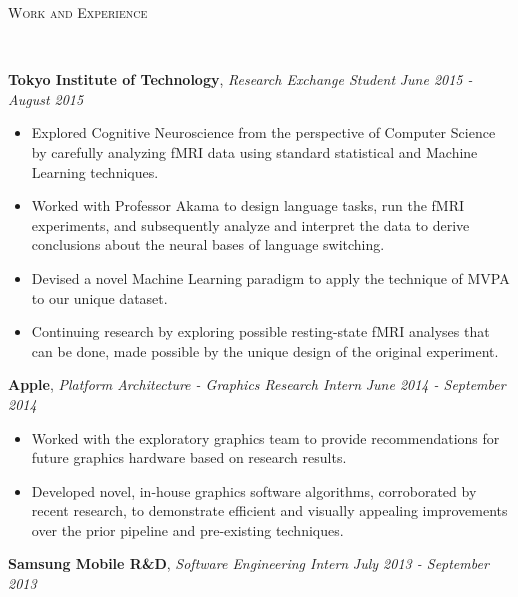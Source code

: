 \documentclass[9pt]{article}
\newenvironment{changemargin}[2]{%
  \begin{list}{}{%
    \setlength{\topsep}{0pt}%
    \setlength{\leftmargin}{#1}%
    \setlength{\rightmargin}{#2}%
    \setlength{\listparindent}{\parindent}%
    \setlength{\itemindent}{\parindent}%
    \setlength{\parsep}{\parskip}%
  }%
  \item[]}{\end{list}
}
\newcommand{\lineover}{
	\begin{changemargin}{-0.05in}{-0.05in}
		\vspace*{-8pt}
		\hrulefill \\
		\vspace*{-2pt}
	\end{changemargin}
}
\newcommand{\header}[1]{
	\begin{changemargin}{-0.5in}{-0.5in}
		\scshape{#1}\\
  	\lineover
	\end{changemargin}
}
\newenvironment{body} {
	\vspace*{-16pt}
	\begin{changemargin}{-0.25in}{-0.5in}
  }	
	{\end{changemargin}
}
\begin{document}
\header{Work and Experience}
\begin{body}
	\vspace{18pt}
	\textbf{Tokyo Institute of Technology}, \emph{Research Exchange Student} \hfill \emph{June 2015 - August 2015}\\
	\vspace*{-3pt}
	\begin{itemize} \itemsep -0pt %
	\item Explored Cognitive Neuroscience from the perspective of Computer Science by carefully analyzing fMRI data using standard statistical and Machine Learning techniques.
	\item Worked with Professor Akama to design language tasks, run the fMRI experiments, and subsequently analyze and interpret the data to derive conclusions about the neural bases of language switching.
	\item Devised a novel Machine Learning paradigm to apply the technique of MVPA to our unique dataset.
	\item Continuing research by exploring possible resting-state fMRI analyses that can be done, made possible by the unique design of the original experiment.
	\end{itemize}
	\vspace*{1pt}
	\textbf{Apple}, \emph{Platform Architecture - Graphics Research Intern} \hfill \emph{June 2014 - September 2014}\\
	\vspace*{-3pt}
	\begin{itemize} \itemsep -0pt %
	\item Worked with the exploratory graphics team to provide recommendations for future graphics hardware based on research results.
	\item Developed novel, in-house graphics software algorithms, corroborated by recent research, to demonstrate efficient and visually appealing improvements over the prior pipeline and pre-existing techniques. 
	\end{itemize}
	\vspace*{1pt}
	\textbf{Samsung Mobile R\&D}, \emph{Software Engineering Intern} \hfill \emph{July 2013 - September 2013}\\
	\vspace*{-3pt}
	\begin{itemize} \itemsep -0pt %

\end{itemize}
\end{body}
\end{document}
